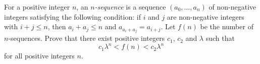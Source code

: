 For a positive integer $n$, an \emph{$n$-sequence} is a sequence $(a_0, \ldots, a_n)$ of non-negative integers satisfying the following condition: if $i$ and $j$ are non-negative integers with $i + j \leq n$, then $a_i + a_j \leq n$ and $a_{a_i + a_j} = a_{i+j}$. Let $f(n)$ be the number of $n$-sequences. Prove that there exist positive integers $c_1$, $c_2$ and $\lambda$ such that
\[
c_1 \lambda^n < f(n) < c_2 \lambda^n
\]
for all positive integers $n$.
